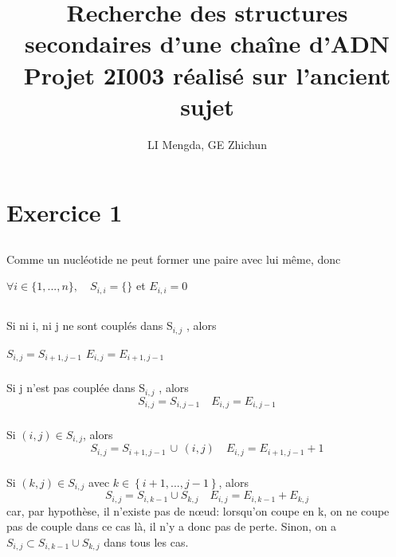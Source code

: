 \documentclass[french]{article}
\title{Recherche des structures secondaires d’une chaîne d’ADN\\
\large Projet 2I003 réalisé sur l'ancient sujet}
\author{LI Mengda, GE Zhichun}
\begin{document}
\lstset{language=Python}	

\maketitle

\section{Exercice 1}

\subsection{}
\label{subsec:q1}
Comme un nucléotide ne peut former une paire avec lui même, donc 

\begin{center}
$\forall i\in\{1,...,n\}, \quad S_{i,i} = \{\}$ et $ E_{i,i} = 0$
\par\end{center}

\subsection{}
\label{subsec:q2}

	\subsubsection{}
	Si ni i, ni j ne sont couplés dans S$_{i,j}$ , alors
	\begin{center}
	$S_{i,j} = S_{i+1,j-1}$ \quad $E_{i,j} = E_{i+1,j-1}$
	\par\end{center}

	\subsubsection{}
	Si j n'est pas couplée dans S$_{i,j}$ , alors
	\[
	S_{i,j} = S_{i,j-1} \quad E_{i,j} = E_{i,j-1}
	\]

	\subsubsection{}
	Si $\left(i,j\right)\in S_{i,j}$, alors
	\[
	S_{i,j}   = S_{i+1,j-1}\, \cup \, \left(i,j\right) \quad  E_{i,j} = E_{i+1,j-1}+ 1
	\]

	\subsubsection{}
	Si $\left(k,j\right)\in S_{i,j}$ avec $k\in\left\{ i+1,...,j-1\right\} $, alors
	\[
	S_{i,j}= S_{i,k-1}\cup S_{k,j} \quad E_{i,j} = E_{i,k-1} + E_{k,j} 
	\]
	car, par hypothèse, il n'existe pas de nœud: lorsqu'on coupe en k, on ne coupe pas de couple dans ce cas là, il n'y a donc pas de perte. Sinon, on a $S_{i,j} \subset S_{i,k-1}\cup S_{k,j} $ dans tous les cas.
\end{document}
